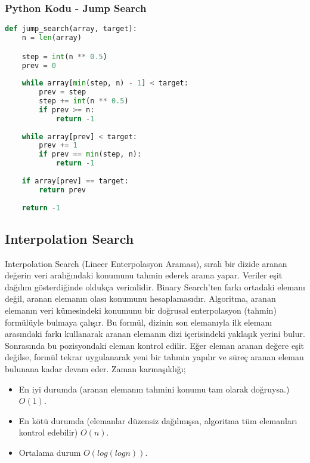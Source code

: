\subsubsection{Python Kodu - Jump Search}

\begin{lstlisting}[language=Python]
def jump_search(array, target):
    n = len(array)

    step = int(n ** 0.5)
    prev = 0
    
    while array[min(step, n) - 1] < target:
        prev = step
        step += int(n ** 0.5)
        if prev >= n:
            return -1
    
    while array[prev] < target:
        prev += 1
        if prev == min(step, n):
            return -1
    
    if array[prev] == target:
        return prev
    
    return -1
\end{lstlisting}

\newpage

\subsection{Interpolation Search}

Interpolation Search (Lineer Enterpolasyon Araması), sıralı bir dizide aranan değerin veri aralığındaki konumunu tahmin ederek arama yapar. Veriler eşit dağılım gösterdiğinde oldukça verimlidir. Binary Search'ten farkı ortadaki elemanı değil, aranan elemanın olası konumunu hesaplamasıdır. Algoritma, aranan elemanın veri kümesindeki konumunu bir doğrusal enterpolasyon (tahmin) formülüyle bulmaya çalışır. Bu formül, dizinin son elemanıyla ilk elemanı arasındaki farkı kullanarak aranan elemanın dizi içerisindeki yaklaşık yerini bulur. Sonrasında bu pozisyondaki eleman kontrol edilir. Eğer eleman aranan değere eşit değilse, formül tekrar uygulanarak yeni bir tahmin yapılır ve süreç aranan eleman bulunana kadar devam eder. Zaman karmaşıklığı;

\begin{itemize}
    \item En iyi durumda (aranan elemanın tahmini konumu tam olarak doğruysa.) $O(1)$.
    \item En kötü durumda (elemanlar düzensiz dağılmışsa, algoritma tüm elemanları kontrol edebilir) $O(n)$.
    \item Ortalama durum $O(log(logn))$.
\end{itemize}

